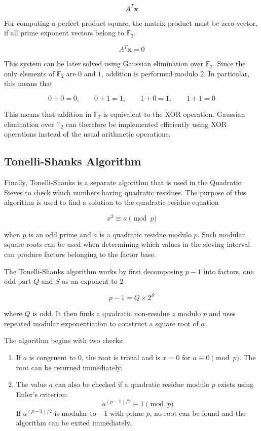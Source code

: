 \documentclass[11pt,a4paper]{article}
\begin{document}
\[
A^T \mathbf{x}
\]

For computing a perfect product square, the matrix product must be zero vector, if all prime exponent vectors belong to $\mathbb{F}_2$.

\[
A^T \mathbf{x} = 0
\]

This system can be later solved using Gaussian elimination over $\mathbb{F}_2$. Since the only elements of $\mathbb{F}_2$ are $0$ and $1$, addition is performed modulo $2$. In particular, this means that

\[
0+0=0,\qquad
0+1=1,\qquad
1+0=1,\qquad
1+1=0
\]

This means that addition in $\mathbb{F}_2$ is equivalent to the XOR operation. Gaussian elimination over $\mathbb{F}_2$ can therefore be implemented efficiently using XOR operations instead of the usual arithmetic operations.

\subsection*{Tonelli-Shanks Algorithm}

Finally, Tonelli-Shanks is a separate algorithm that is used in the Quadratic Sieves to check which numbers having quadratic residues. The purpose of this algorithm is used to find a solution to the quadratic residue equation

\[
x^2 \equiv a \pmod{p}
\]

when $p$ is an odd prime and $a$ is a quadratic residue modulo $p$. Such modular square roots can be used when determining which values in the sieving interval can produce factors belonging to the factor base.

The Tonelli-Shanks algorithm works by first decomposing $p-1$ into factors, one odd part $Q$ and $S$ as an exponent to $2$

\[
p-1 = Q \times 2^S
\]

where $Q$ is odd. It then finds a quadratic non-residue $z$ modulo $p$ and uses repeated modular exponentiation to construct a square root of $a$.

The algorithm begins with two checks:

\begin{enumerate}
    \item If $a$ is congruent to $0$, the root is trivial and is $x=0$ for $a \equiv 0 \pmod p$. The root can be returned immediately.
    \item The value $a$ can also be checked if a quadratic residue modulo $p$ exists using Euler's criterion:
    \[
        a^{(p-1)/2} \equiv 1 \pmod p
    \]
    If $a^{(p-1)/2}$ is modular to $-1$ with prime $p$, no root can be found and the algorithm can be exited immediately.
\end{enumerate}
\end{document}
